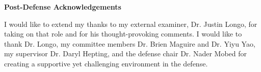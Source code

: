 
\begin{doublespace}
\begin{center}
\textbf{Post-Defense Acknowledgements}
\end{center}

I would like to extend my thanks to my external examiner,
Dr. Justin Longo, for taking on that role and for his thought-provoking comments.
I would like to thank Dr. Longo,
my committee members Dr. Brien Maguire and Dr. Yiyu Yao,
my supervisor Dr. Daryl Hepting, and the defense chair Dr. Nader Mobed
for creating a supportive yet challenging environment in the defense.
%

\end{doublespace}

